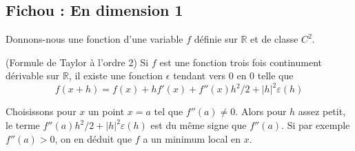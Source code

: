 \documentclass[12pt, class=report,crop=false]{standalone}
\begin{document}
\subsection{Fichou : En dimension 1}
Donnons-nous une fonction d'une variable $f$ définie sur $\mathbb R$ et de classe $C^2$. 

\begin{theoreme} (Formule de Taylor \`a l'ordre 2) Si $f$ est une fonction trois fois continument dérivable sur $\mathbb{R}$, il existe une fonction $\epsilon$ tendant vers 0 en 0 telle que
$$f(x + h) = f(x) + hf'(x) +f''(x)h^2/2 + |h|^2 \varepsilon (h)$$
\end{theoreme}

Choisissons pour $x$ un point $x=a$ tel que $f''(a)\neq 0$. Alors pour $h$ assez petit, le terme $f''(a)h^2/2 + |h|^2 \varepsilon (h)$ est du m\^eme signe que $f''(a)$. Si par exemple   $f''(a)>0$, on en déduit que $f$ a un minimum local en $x$.
\end{document}
